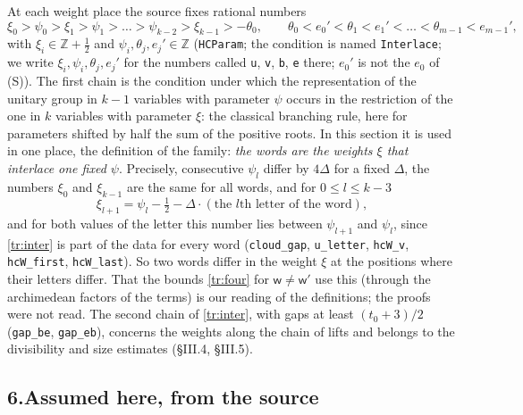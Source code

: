 \documentclass[11pt,letterpaper]{article}
\newcommand{\Z}{\mathbb Z}\newcommand{\Q}{\mathbb Q}\newcommand{\C}{\mathbb C}
\begin{document}
At each weight place the source fixes rational numbers
\begin{equation}\label{tr:inter}
 \xi_0>\psi_0>\xi_1>\psi_1>\dots>\psi_{k-2}>\xi_{k-1}>-\theta_0,\qquad \theta_0<e_0'<\theta_1<e_1'<\dots<\theta_{m-1}<e_{m-1}',
\end{equation}
with $\xi_i\in\Z+\frac12$ and $\psi_i,\theta_j,e_j'\in\Z$ (\texttt{HCParam}; the condition is named \texttt{Interlace}; we
write $\xi_i,\psi_i,\theta_j,e_j'$ for the numbers called \texttt{u}, \texttt{v}, \texttt{b}, \texttt{e} there; $e_0'$ is not the
$e_0$ of (S)). The first chain is
the condition under which the representation of the unitary group in $k-1$ variables with parameter $\psi$
occurs in the restriction of the one in $k$ variables with parameter $\xi$: the classical branching rule, here for parameters
shifted by half the sum of the positive roots. In this section it is used in one place, the definition of
the family: \emph{the words are the weights $\xi$ that interlace one fixed $\psi$}. Precisely, consecutive $\psi_l$
differ by $4\Delta$ for a fixed $\Delta$, the numbers $\xi_0$ and $\xi_{k-1}$ are the same for all words, and for
$0\le l\le k-3$
\begin{equation}\label{D:328}
 \xi_{l+1}=\psi_l-\tfrac12-\Delta\cdot(\text{the }l\text{th letter of the word}),
\end{equation}
and for both values of the letter this number lies between $\psi_{l+1}$ and $\psi_l$, since \eqref{tr:inter} is
part of the data for every word (\texttt{cloud\_gap}, \texttt{u\_letter}, \texttt{hcW\_v}, \texttt{hcW\_first},
\texttt{hcW\_last}). So two words differ in the weight $\xi$ at the positions
where their letters differ. That the bounds \eqref{tr:four} for $\mathsf w\ne\mathsf w'$ use this (through the
archimedean factors of the terms) is our reading of the definitions; the proofs were not read. The second
chain of \eqref{tr:inter}, with gaps at least $(t_0+3)/2$ (\texttt{gap\_be}, \texttt{gap\_eb}), concerns the weights along the chain of lifts and
belongs to the divisibility and size estimates (\S III.4, \S III.5).

\subsection*{6.\quad Assumed here, from the source}
\end{document}
